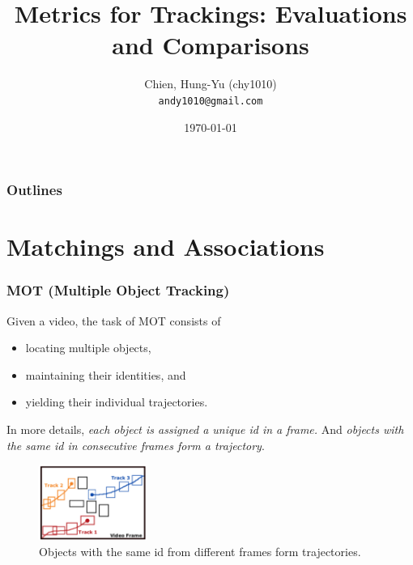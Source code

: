 \documentclass[slidetop, mathserif]{beamer}
\title[Metrics for Tracking]{Metrics for Trackings: Evaluations and Comparisons}
\author[chy1010]{Chien, Hung-Yu (chy1010) \\ {\tt andy1010@gmail.com}}
\date{\today}
\begin{document}
\frame{\titlepage}

\section[Outline]{}
\begin{frame}
    \frametitle{Outlines}
    \tableofcontents
\end{frame}

\section{Matchings and Associations}

\begin{frame}
	\frametitle{MOT (Multiple Object Tracking)}
	
	Given a video, the task of MOT consists of 
	\begin{itemize}
		\item locating multiple objects,
		\item maintaining their identities, and
		\item yielding their individual trajectories.
	\end{itemize}
	
	In more details, \emph{each object is assigned a unique id in a frame.}
	And \emph{objects with the same id in consecutive frames form a trajectory}.
	
	\begin{figure}
		\includegraphics[height=70pt]{pics/fig1.png}
		\caption{Objects with the same id from different frames form trajectories.}
	\end{figure}
	
\end{frame}
\end{document}
